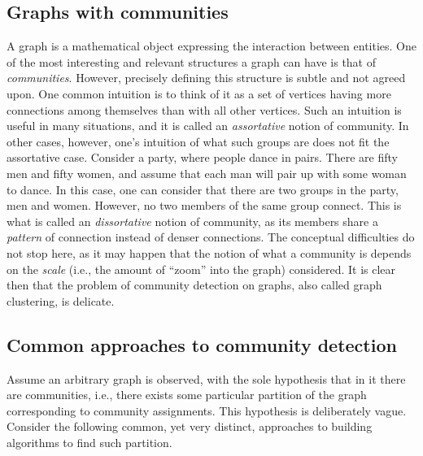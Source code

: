 \documentclass[../../main.tex]{subfiles} %
\begin{document}
\subsection{Graphs with communities}
A graph is a mathematical object expressing the interaction between entities. 
One of the most interesting and relevant structures a graph can have 
is that of \textit{communities}. However, precisely defining this structure is 
subtle and not agreed upon. One common intuition is to think of it as a 
set of vertices having more connections among themselves than with all other 
vertices. Such an intuition is useful in many situations, and it is called an 
\textit{assortative} notion of community. In other cases, however, one's 
intuition of what such groups are does not fit the assortative case. Consider a 
party, where people dance in pairs. There are fifty men and fifty women, and 
assume that each man will pair up with some woman to dance. In this case, one 
can consider that there are two groups in the party, men and women. 
However, no two members of the same group connect. This is what is called 
an \textit{dissortative} notion of community, as its members share a 
\textit{pattern} of connection instead of denser connections. The conceptual 
difficulties do not stop here, as it may happen that the notion of what a 
community is depends on the \textit{scale} (i.e., the amount of ``zoom'' into 
the 
graph) considered. It is clear then that the problem of community detection on 
graphs, also called graph clustering, is delicate.

\subsection{Common approaches to community detection}

Assume an arbitrary graph is observed, with the sole hypothesis that in it 
there are communities, i.e., there exists some particular partition of the 
graph corresponding to community assignments. This hypothesis is deliberately 
vague. Consider the following common, yet very distinct, approaches to building 
algorithms to find such partition.
\end{document}
